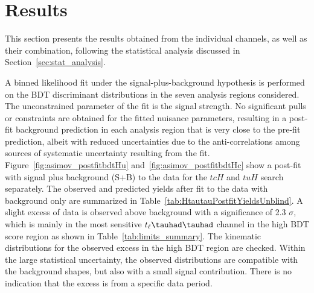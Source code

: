 \section{Results}
\label{sec:result}

This section presents the results obtained from the individual channels, as well as their combination,
following the statistical analysis discussed in Section~\ref{sec:stat_analysis}.

A binned likelihood fit under the signal-plus-background hypothesis is performed on the BDT discriminant distributions in the seven 
analysis regions considered. The unconstrained parameter of the fit is the signal strength.
No significant pulls or constraints are obtained for the fitted nuisance parameters, resulting in a post-fit background prediction in each analysis region that is
very close to the pre-fit prediction, albeit with reduced uncertainties due to the anti-correlations among sources of systematic uncertainty resulting from the fit.
Figure~\ref{fig:asimov_postfitbdtHu} and~\ref{fig:asimov_postfitbdtHc} show a post-fit with signal plus background (S+B) to the data for
the $tcH$ and $tuH$ search separately.
The observed and predicted yields after fit to the data with background only are summarized in Table~\ref{tab:HtautauPostfitYieldsUnblind}.
A slight excess of data is observed above background with a significance of 2.3 $\sigma$, which is mainly in the most sensitive $t_{\ell}\thadhad$ channel in the high BDT score region as shown in
Table~\ref{tab:limits_summary}.
The kinematic distributions for the observed excess in
the high BDT region are checked. Within the large statistical uncertainty, the observed distributions are compatible with the background shapes, but also with a small signal contribution. There is no indication that the excess is from a specific data period.

